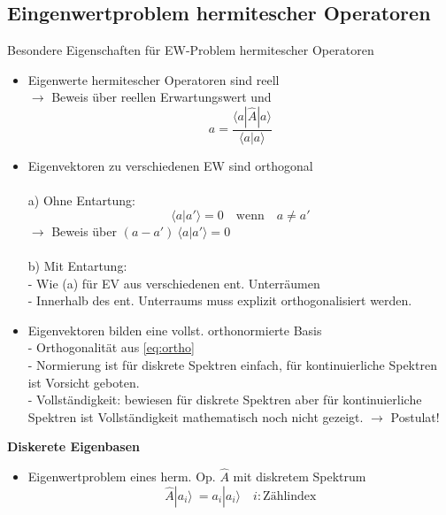 \documentclass[10pt,article,colorback,accentcolor=tud9d]{scrartcl}
\begin{document}
\begin{fleqn}
\subsection{Eingenwertproblem hermitescher Operatoren}
Besondere Eigenschaften für EW-Problem hermitescher Operatoren
  \begin{itemize}
    \item Eigenwerte hermitescher Operatoren sind reell\\
      $\rightarrow$ Beweis über reellen Erwartungswert und 
      \begin{equation}
      a=\frac{\langle a\left.\right|\hat{A}\left.\right|a\rangle }{\langle a\left.\right|a\rangle }
      \end{equation}
    \item Eigenvektoren zu verschiedenen EW sind orthogonal\\ \\
      a) Ohne Entartung:
         \begin{equation}
        \label{eq:ortho}
          \langle a\left.\right|a'\rangle  = 0 \quad \text{wenn} \quad a \neq a'
          \end{equation}
          $\rightarrow$ Beweis über $(a-a') \ \langle a\left.\right|a'\rangle  = 0$\\ \\
      b) Mit Entartung:\\
         - Wie (a) für EV aus verschiedenen ent. Unterräumen\\
         - Innerhalb des ent. Unterraums muss explizit orthogonalisiert werden.
    \item Eigenvektoren bilden eine vollst. orthonormierte Basis\\
      - Orthogonalität aus \ref{eq:ortho}\\
      - Normierung ist für diskrete Spektren einfach, für kontinuierliche Spektren ist Vorsicht geboten.\\
      - Vollständigkeit: bewiesen für diskrete Spektren aber für kontinuierliche Spektren ist Vollständigkeit mathematisch noch nicht gezeigt. $\rightarrow$ Postulat!
  \end{itemize}
\textbf{Diskerete Eigenbasen}
\begin{itemize}
  \item Eigenwertproblem eines herm. Op. $\hat{A}$ mit diskretem Spektrum
    \begin{equation}
    \hat{A}\left.\right|a_i\rangle  \ = a_i\left.\right|a_i\rangle  \quad i:\text{Zählindex}
    \end{equation}

\end{itemize}
\end{fleqn}
\end{document}
